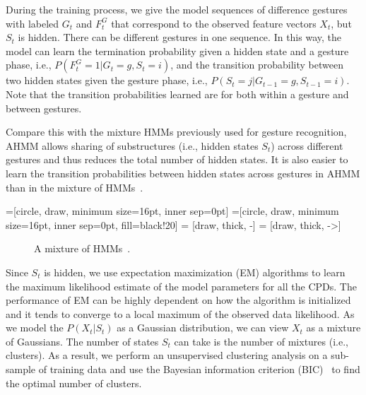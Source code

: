 \documentclass{sigchi}
\begin{document}
During the training process, we give the model sequences of difference gestures
with labeled $G_t$ and $F_t^G$ that correspond to the observed feature vectors
$X_t$, but $S_t$ is hidden. There can be different gestures in one sequence. In
this way, the model can learn the termination probability given a hidden state
and a gesture phase, i.e.,
$P(F_t^G = 1 | G_t = g, S_t = i)$, and the transition probability between two
hidden states given the gesture phase, i.e., $P(S_t = j | G_{t - 1} = g,
S_{t - 1} = i)$. Note that the transition probabilities learned are for both
within a gesture and between gestures.

Compare this with the mixture HMMs previously used for gesture recognition,
AHMM allows sharing of substructures (i.e., hidden states $S_t$) across
different gestures and thus reduces the total number of hidden states. It is
also easier to learn the transition probabilities between hidden states across
gestures in AHMM than in the mixture of HMMs~\cite{murphy02}.

=[circle, draw, minimum size=16pt, inner sep=0pt]
=[circle, draw, minimum size=16pt, inner
sep=0pt, fill=black!20] 
 = [draw, thick, -]
 = [draw, thick, ->]

\begin{figure}[tb]
\centering
  \caption{A mixture of HMMs~\cite{murphy02}.}
  \label{fig:amms}
\end{figure}

Since $S_t$ is hidden, we use expectation maximization (EM)
algorithms to learn the maximum likelihood estimate of the model parameters for
all the CPDs. The performance of EM can be highly dependent on how the algorithm
is initialized~\cite{dicintio2012} and it tends to converge to a local maximum
of the observed data likelihood. As we model the $P(X_t | S_t)$ as a Gaussian
distribution, we can view $X_t$ as a mixture of Gaussians. The number of states 
$S_t$ can take is the number of mixtures (i.e., clusters). As a result, we
perform an unsupervised clustering analysis on a sub-sample of training data and
use the Bayesian information criterion (BIC)~\cite{fraley12} to find the optimal
number of clusters.
\end{document}
